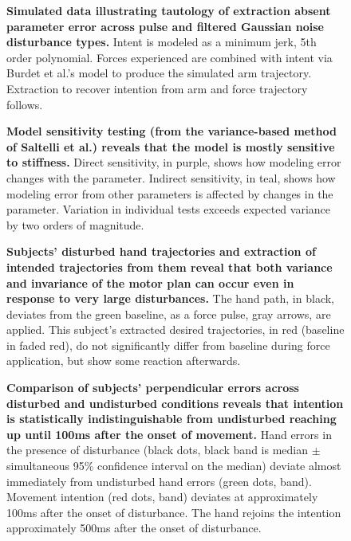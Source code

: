 \documentclass[10pt]{article}
\begin{document}
\begin{figure}[!ht]
\begin{center}
\end{center}
\caption{
{\bf Simulated data illustrating tautology of extraction absent parameter error across pulse and filtered Gaussian noise disturbance types.} Intent is modeled as a minimum jerk, 5th order polynomial. Forces experienced are combined with intent via Burdet et al.'s \cite{burdet2006stability} model to produce the simulated arm trajectory. Extraction to recover intention from arm and force trajectory follows.
}
\label{fig:synthetic}
\end{figure}

\begin{figure}[!ht]
\begin{center}
\end{center}
\caption{
{\bf Model sensitivity testing (from the variance-based method of Saltelli et al.\cite{saltelli2010variance}) reveals that the model is mostly sensitive to stiffness.} Direct sensitivity, in purple, shows how modeling error changes with the parameter. Indirect sensitivity, in teal, shows how modeling error from other parameters is affected by changes in the parameter. Variation in individual tests exceeds expected variance by two orders of magnitude.
}
\label{fig:sensitivity}
\end{figure}

\begin{figure}[!ht]
\begin{center}
\end{center}
\caption{
{\bf Subjects' disturbed hand trajectories and extraction of intended trajectories from them reveal that both variance and invariance of the motor plan can occur even in response to very large disturbances.} The hand path, in black, deviates from the green baseline, as a force pulse, gray arrows, are applied. This subject's extracted desired trajectories, in red (baseline in faded red), do not significantly differ from baseline during force application, but show some reaction afterwards.
}
\label{fig:anecdotes}
\end{figure}

\begin{figure}[!ht]
\begin{center}
\end{center}
\caption{
{\bf Comparison of subjects' perpendicular errors across disturbed and undisturbed conditions reveals that intention is statistically indistinguishable from undisturbed reaching up until 100ms after the onset of movement.} Hand errors in the presence of disturbance (black dots, black band is median $\pm$ simultaneous 95\% confidence interval on the median) deviate almost immediately from undisturbed hand errors (green dots, band). Movement intention (red dots, band) deviates at approximately 100ms after the onset of disturbance. The hand rejoins the intention approximately 500ms after the onset of disturbance.
}
\label{fig:grouptrends}
\end{figure}
\end{document}

